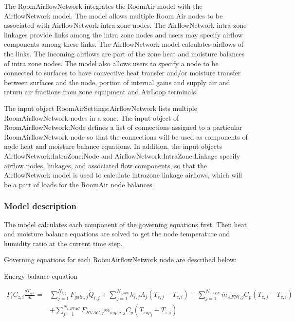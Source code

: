 {The RoomAirflowNetwork integrates the RoomAir model with the AirflowNetwork model. The model allows multiple Room Air nodes to be associated with AirflowNetwork intra zone nodes. The AirflowNetwork intra zone linkages provide links among the intra zone nodes and users may specify airflow components among these links. The AirflowNetwork model calculates airflows of the links. The incoming airflows are part of the zone heat and moisture balances of intra zone nodes. The model also allows users to specify a node to be connected to surfaces to have convective heat transfer and/or moisture transfer between surfaces and the node, portion of internal gains and supply air and return air fractions from zone equipment and AirLoop terminals.

The input object RoomAirSettings:AirflowNetwork lists multiple RoomAirflowNetwork nodes in a zone. The input object of RoomAirflowNetwork:Node defines a list of connections assigned to a particular RoomAirflowNetwork node so that the connections will be used as components of node heat and moisture balance equations. In addition, the input objects AirflowNetwork:IntraZone:Node and AirflowNetwork:IntraZone:Linkage specify airflow nodes, linkages, and associated flow components, so that the AirflowNetwork model is used to calculate intrazone linkage airflows, which will be a part of loads for the RoomAir node balances.

\subsubsection{Model description}\label{model-description-3-001}

The model calculates each component of the governing equations first. Then heat and moisture balance equations are solved to get the node temperature and humidity ratio at the current time step.

Governing equations for each RoomAirflowNetwork node are described below:

Energy balance equation

\begin{equation}
\begin{split}
{F_i}{C_{z,i}}\frac{{d{T_{z,i}}}}{{dt}} =& \sum\limits_{j = 1}^{{N_{i,g}}} {{F_{gain,j}{\dot Q}_{i,j}}}  + \sum\limits_{j = 1}^{{N_{i,sur}}} {{h_{i,j}}} {A_j}\left( {{T_{s,j}} - {T_{z,i}}} \right) + \sum\limits_{j = 1}^{{N_{i,AFN}}} {{{\dot m}_{AFN i,j}}} {C_p}\left( {{T_{z,j}} - {T_{z,i}}} \right)\, \\
&+ \sum\limits_{j = 1}^{{N_{i,HVAC}}} {{{F_{HVAC,j}}{\dot m}_{sup,i,j}}} {C_p}\left( {{T_{sup_j}} - {T_{z,i}}} \right)
\end{split}
\end{equation}

}
